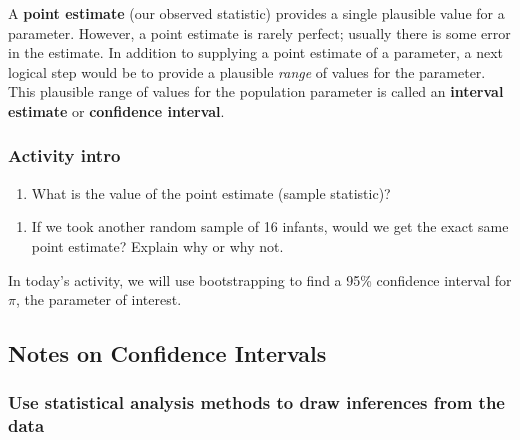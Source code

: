 \documentclass[
]{report}
\providecommand{\tightlist}{%
  \setlength{\itemsep}{0pt}\setlength{\parskip}{0pt}}
\begin{document}
A \textbf{point estimate} (our observed statistic) provides a single plausible value for a parameter. However, a point estimate is rarely perfect; usually there is some error in the estimate. In addition to supplying a point estimate of a parameter, a next logical step would be to provide a plausible \emph{range} of values for the parameter. This plausible range of values for the population parameter is called an \textbf{interval estimate} or \textbf{confidence interval}.

\subsubsection*{Activity intro}\label{activity-intro}

\begin{enumerate}
\def\labelenumi{\arabic{enumi}.}
\tightlist
\item
  What is the value of the point estimate (sample statistic)?
\end{enumerate}

\vspace{0.3in}

\begin{enumerate}
\def\labelenumi{\arabic{enumi}.}
\setcounter{enumi}{1}
\tightlist
\item
  If we took another random sample of 16 infants, would we get the exact same point estimate? Explain why or why not.
\end{enumerate}

\vspace{0.5in}

In today's activity, we will use bootstrapping to find a 95\% confidence interval for \(\pi\), the parameter of interest.

\subsection*{Notes on Confidence Intervals}\label{notes-on-confidence-intervals}

\vspace{2in}

\subsubsection*{Use statistical analysis methods to draw inferences from the data}\label{use-statistical-analysis-methods-to-draw-inferences-from-the-data-1}
\end{document}
